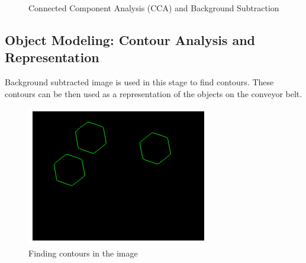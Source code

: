 \documentclass[a4paper,12pt]{book}%
\begin{document}
\begin{figure}[H]
	\centering
	\hspace{5mm}
\caption{Connected Component Analysis (CCA) and Background Subtraction}
\end{figure}

\subsection{Object Modeling: Contour Analysis and Representation}

Background subtracted image is used in this stage to find contours. These contours can be then used as a representation of the objects on the conveyor belt.

\begin{figure}[H]
	\centering
	\includegraphics[scale=0.65]{figures/contours}
	\caption{Finding contours in the image}
\end{figure}
\end{document}
